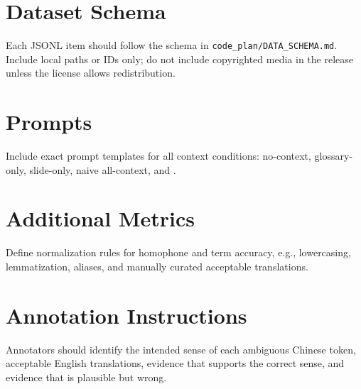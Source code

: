 \section{Dataset Schema}
\label{app:schema}

Each JSONL item should follow the schema in \texttt{code\_plan/DATA\_SCHEMA.md}.  Include local paths or IDs only; do not include copyrighted media in the release unless the license allows redistribution.

\section{Prompts}
\label{app:prompts}

Include exact prompt templates for all context conditions: no-context, glossary-only, slide-only, naive all-context, and \policyname{}.

\section{Additional Metrics}
\label{app:metrics}

Define normalization rules for homophone and term accuracy, e.g., lowercasing, lemmatization, aliases, and manually curated acceptable translations.

\section{Annotation Instructions}
\label{app:annotation}

Annotators should identify the intended sense of each ambiguous Chinese token, acceptable English translations, evidence that supports the correct sense, and evidence that is plausible but wrong.
